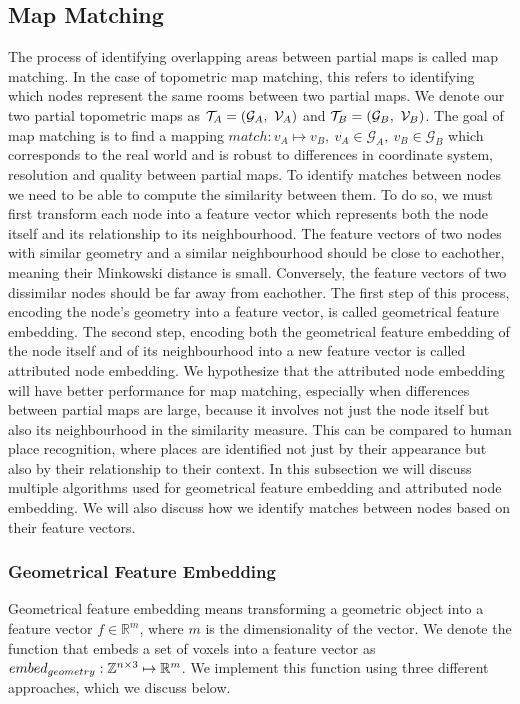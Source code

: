 \subsection{Map Matching}
The process of identifying overlapping areas between partial maps is called map matching. In the case of topometric map matching, this refers to identifying which nodes represent the same rooms between two partial maps. We denote our two partial topometric maps as \(\topometricmap_A = (\mathcal{G}_A,\ \voxelgrid_A)\) and \(\mathcal{T}_B = (\mathcal{G}_B,\ \mathcal{V}_B)\). The goal of map matching is to find a mapping \(match: v_A \mapsto v_B,\ v_A \in \mathcal{G}_A,\ v_B \in \mathcal{G}_B\) which corresponds to the real world and is robust to differences in coordinate system, resolution and quality between partial maps. To identify matches between nodes we need to be able to compute the similarity between them. To do so, we must first transform each node into a feature vector which represents both the node itself and its relationship to its neighbourhood. The feature vectors of two nodes with similar geometry and a similar neighbourhood should be close to eachother, meaning their Minkowski distance is small. Conversely, the feature vectors of two dissimilar nodes should be far away from eachother. The first step of this process, encoding the node's geometry into a feature vector, is called geometrical feature embedding. The second step, encoding both the geometrical feature embedding of the node itself and of its neighbourhood into a new feature vector is called attributed node embedding. We hypothesize that the attributed node embedding will have better performance for map matching, especially when differences between partial maps are large, because it involves not just the node itself but also its neighbourhood in the similarity measure. This can be compared to human place recognition, where places are identified not just by their appearance but also by their relationship to their context. In this subsection we will discuss multiple algorithms used for geometrical feature embedding and attributed node embedding. We will also discuss how we identify matches between nodes based on their feature vectors.

\subsubsection{Geometrical Feature Embedding}
Geometrical feature embedding means transforming a geometric object into a feature vector \(f \in \mathbb{R}^m\), where \(m\) is the dimensionality of the vector. We denote the function that embeds a set of voxels into a feature vector as \(embed_{geometry}: \mathbb{Z}^{n \times 3} \mapsto \mathbb{R}^m\). We implement this function using three different approaches, which we discuss below.

